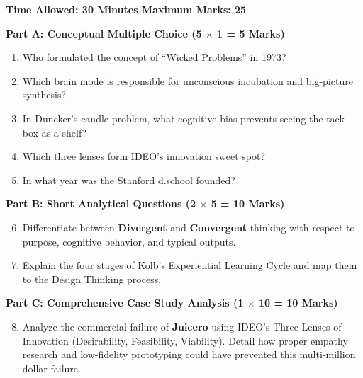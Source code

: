 \begin{chaptertest}
\textbf{Time Allowed: 30 Minutes \hfill Maximum Marks: 25}

\vspace{0.4cm}
\noindent\textbf{Part A: Conceptual Multiple Choice (5 $\times$ 1 = 5 Marks)}
\begin{enumerate}[leftmargin=1.2em, itemsep=2pt]
    \item Who formulated the concept of ``Wicked Problems'' in 1973?
    \item Which brain mode is responsible for unconscious incubation and big-picture synthesis?
    \item In Duncker's candle problem, what cognitive bias prevents seeing the tack box as a shelf?
    \item Which three lenses form IDEO's innovation sweet spot?
    \item In what year was the Stanford d.school founded?
\end{enumerate}

\vspace{0.3cm}
\noindent\textbf{Part B: Short Analytical Questions (2 $\times$ 5 = 10 Marks)}
\begin{enumerate}[leftmargin=1.2em, itemsep=4pt]
    \setcounter{enumi}{5}
    \item Differentiate between \textbf{Divergent} and \textbf{Convergent} thinking with respect to purpose, cognitive behavior, and typical outputs.
    \item Explain the four stages of Kolb's Experiential Learning Cycle and map them to the Design Thinking process.
\end{enumerate}

\vspace{0.3cm}
\noindent\textbf{Part C: Comprehensive Case Study Analysis (1 $\times$ 10 = 10 Marks)}
\begin{enumerate}[leftmargin=1.2em, itemsep=4pt]
    \setcounter{enumi}{7}
    \item Analyze the commercial failure of \textbf{Juicero} using IDEO's Three Lenses of Innovation (Desirability, Feasibility, Viability). Detail how proper empathy research and low-fidelity prototyping could have prevented this multi-million dollar failure.
\end{enumerate}
\end{chaptertest}

